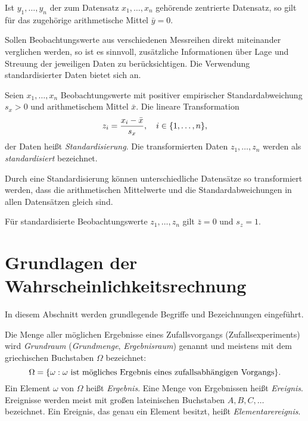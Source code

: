\documentclass{lecture}
\begin{document}
    \begin{calcrule}
        Ist \(y_1, \ldots, y_n\) der zum Datensatz \(x_1, \ldots, x_n\) gehörende zentrierte Datensatz, so gilt für das zugehörige arithmetische Mittel \(\bar{y} = 0\).
    \end{calcrule}

    Sollen Beobachtungswerte aus verschiedenen Messreihen direkt miteinander verglichen werden, so ist es sinnvoll, zusätzliche Informationen über Lage und Streuung der jeweiligen Daten zu berücksichtigen.
    Die Verwendung standardisierter Daten bietet sich an.

    \begin{definition}
        Seien \(x_1, \ldots, x_n\) Beobachtungswerte mit positiver empirischer Standardabweichung \(s_x > 0\) und arithmetischem Mittel \(\bar{x}\).
        Die lineare Transformation
        \[
            z_i = \frac{x_i - \bar{x}}{s_x}, \quad i \in \braces*{1, \ldots, n},
        \]
        der Daten heißt \emph{Standardisierung}.
        Die transformierten Daten \(z_1, \ldots, z_n\) werden als \emph{standardisiert} bezeichnet.
    \end{definition}

    Durch eine Standardisierung können unterschiedliche Datensätze so transformiert werden, dass die arithmetischen Mittelwerte und die Standardabweichungen in allen Datensätzen gleich sind.

    \begin{calcrule}
        Für standardisierte Beobachtungswerte \(z_1, \ldots, z_n\) gilt \(\bar{z} = 0\) und \(s_z = 1\).
    \end{calcrule}


    \section*{Grundlagen der Wahrscheinlichkeitsrechnung}

    In diesem Abschnitt werden grundlegende Begriffe und Bezeichnungen eingeführt.

    \begin{definition}
        Die Menge aller möglichen Ergebnisse eines Zufallsvorgangs (Zufallsexperiments) wird \emph{Grundraum} (\emph{Grundmenge}, \emph{Ergebnisraum}) genannt und meistens mit dem griechischen Buchstaben \(\Omega\) bezeichnet:
        \[
            \Omega = \braces*{\omega : \omega\text{ ist mögliches Ergebnis eines zufallsabhängigen Vorgangs}}.
        \]
        Ein Element \(\omega\) von \(\Omega\) heißt \emph{Ergebnis}.
        Eine Menge von Ergebnissen heißt \emph{Ereignis}.
        Ereignisse werden meist mit großen lateinischen Buchstaben \(A, B, C, \ldots\) bezeichnet.
        Ein Ereignis, das genau ein Element besitzt, heißt \emph{Elementarereignis}.
    \end{definition}
\end{document}
